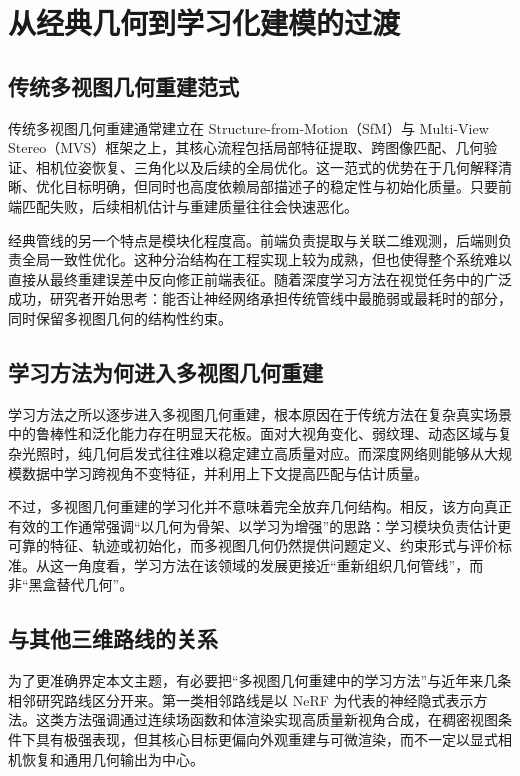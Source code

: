 \section{从经典几何到学习化建模的过渡}

\subsection{传统多视图几何重建范式}

传统多视图几何重建通常建立在 Structure-from-Motion（SfM）与 Multi-View Stereo（MVS）框架之上，其核心流程包括局部特征提取、跨图像匹配、几何验证、相机位姿恢复、三角化以及后续的全局优化\cite{triggs2000bundle,schoenberger2016colmap}。这一范式的优势在于几何解释清晰、优化目标明确，但同时也高度依赖局部描述子的稳定性与初始化质量。只要前端匹配失败，后续相机估计与重建质量往往会快速恶化。

经典管线的另一个特点是模块化程度高。前端负责提取与关联二维观测，后端则负责全局一致性优化。这种分治结构在工程实现上较为成熟，但也使得整个系统难以直接从最终重建误差中反向修正前端表征\cite{wang2024vggsfm}。随着深度学习方法在视觉任务中的广泛成功，研究者开始思考：能否让神经网络承担传统管线中最脆弱或最耗时的部分，同时保留多视图几何的结构性约束。

\subsection{学习方法为何进入多视图几何重建}

学习方法之所以逐步进入多视图几何重建，根本原因在于传统方法在复杂真实场景中的鲁棒性和泛化能力存在明显天花板。面对大视角变化、弱纹理、动态区域与复杂光照时，纯几何启发式往往难以稳定建立高质量对应\cite{wang2021deep2view}。而深度网络则能够从大规模数据中学习跨视角不变特征，并利用上下文提高匹配与估计质量。

不过，多视图几何重建的学习化并不意味着完全放弃几何结构。相反，该方向真正有效的工作通常强调“以几何为骨架、以学习为增强”的思路：学习模块负责估计更可靠的特征、轨迹或初始化，而多视图几何仍然提供问题定义、约束形式与评价标准\cite{bhalgat2023lighttouch,wang2024vggsfm}。从这一角度看，学习方法在该领域的发展更接近“重新组织几何管线”，而非“黑盒替代几何”。

\subsection{与其他三维路线的关系}

为了更准确界定本文主题，有必要把“多视图几何重建中的学习方法”与近年来几条相邻研究路线区分开来。第一类相邻路线是以 NeRF 为代表的神经隐式表示方法\cite{mildenhall2020nerf}。这类方法强调通过连续场函数和体渲染实现高质量新视角合成，在稠密视图条件下具有极强表现，但其核心目标更偏向外观重建与可微渲染，而不一定以显式相机恢复和通用几何输出为中心。

